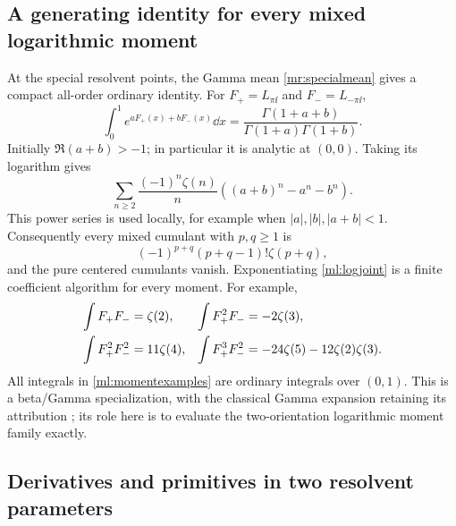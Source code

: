 \subsection{A generating identity for every mixed logarithmic moment}

At the special resolvent points, the Gamma mean \eqref{mr:specialmean}
gives a compact all-order ordinary identity. For
$F_+=L_{\pi\ii}$ and $F_-=L_{-\pi\ii}$,
\begin{equation}\label{ml:jointcumulants}
 \int_0^1e^{aF_+(x)+bF_-(x)}\dd x
       =\frac{\Gamma(1+a+b)}{\Gamma(1+a)\Gamma(1+b)}.
\end{equation}
Initially $\Re(a+b)>-1$; in particular it is analytic at $(0,0)$.
Taking its logarithm gives
\begin{equation}\label{ml:logjoint}
 \sum_{n\ge2}\frac{(-1)^n\zeta(n)}n
                     \left((a+b)^n-a^n-b^n\right).
\end{equation}
This power series is used locally, for example when
$|a|,|b|,|a+b|<1$.
Consequently every mixed cumulant with $p,q\ge1$ is
\begin{equation}\label{ml:cumulant}
              (-1)^{p+q}(p+q-1)!\zeta(p+q),
\end{equation}
and the pure centered cumulants vanish. Exponentiating
\eqref{ml:logjoint} is a finite coefficient algorithm for every moment.
For example,
\begin{align}
 \int F_+F_-&=\zeta(2),&
 \int F_+^2F_-&=-2\zeta(3),\notag\\
 \int F_+^2F_-^2&=11\zeta(4),&
 \int F_+^3F_-^2&=-24\zeta(5)-12\zeta(2)\zeta(3).
       \label{ml:momentexamples}
\end{align}
All integrals in \eqref{ml:momentexamples} are ordinary integrals over
$(0,1)$. This is a beta/Gamma specialization, with the classical Gamma
expansion retaining its attribution \cite{dlmf:gamma}; its role here is
to evaluate the two-orientation logarithmic moment family exactly.

\subsection{Derivatives and primitives in two resolvent parameters}

